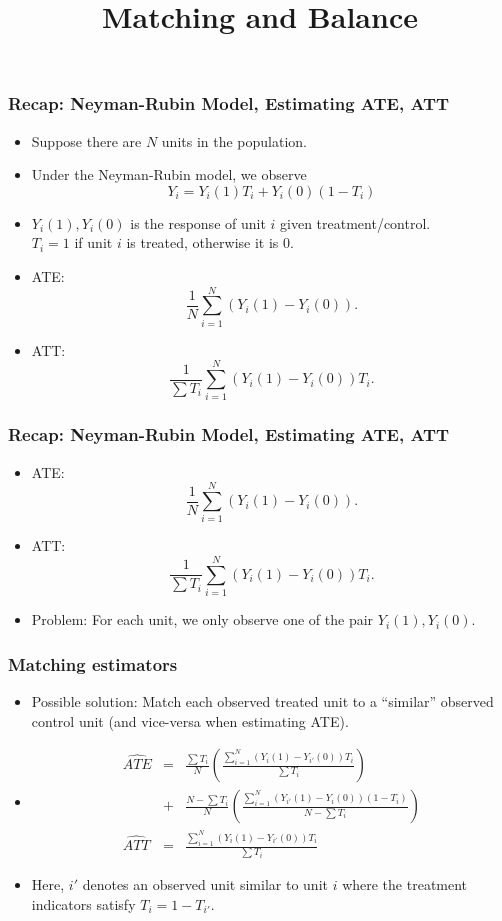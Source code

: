 \documentclass{beamer}
\title{Matching and Balance}
\begin{document}

\frame{\titlepage}
\begin{frame}[c]
\frametitle{Recap: Neyman-Rubin Model, Estimating ATE, ATT}  
  \begin{itemize}  
    \item<1->  Suppose there are $N$ units in the population.\\
    \item<1->Under the Neyman-Rubin model, we observe
      $$Y_i = Y_i(1)T_i + Y_i(0)(1-T_i)$$
    \item<1->
      $Y_i(1),Y_i(0)$ is the response of unit $i$ given treatment/control.\\ 
      $T_i = 1$ if unit $i$ is treated, otherwise it is 0.
    \item<2->ATE:
      $$\frac{1}{N}\sum_{i=1}^N (Y_i(1) - Y_i(0)).$$
    \item<2-> ATT:  
      $$\frac{1}{\sum T_i}\sum_{i=1}^N (Y_i(1) - Y_{i}(0))T_i.$$
  \end{itemize}
\end{frame}

\begin{frame}[c]
\frametitle{Recap: Neyman-Rubin Model, Estimating ATE, ATT}  
  \begin{itemize}
    \item<1->ATE:
      $$\frac{1}{N}\sum_{i=1}^N (Y_i(1) - Y_i(0)).$$
    \item<1-> ATT:  
      $$\frac{1}{\sum T_i}\sum_{i=1}^N (Y_i(1) - Y_{i}(0))T_i.$$
    \item<2->  Problem: For each unit, we only observe one of the pair
      $Y_i(1), Y_i(0)$.    
  \end{itemize}
\end{frame}

\begin{frame}[c]
\frametitle{Matching estimators}  
  \begin{itemize}
   \item<1->  Possible solution: Match each observed 
    treated unit to a ``similar'' observed control unit
     (and vice-versa when estimating ATE).
   \item<2-> 
    \begin{eqnarray*}
       \widehat{ATE} &=& \frac{\sum T_i}{N}\left(
        \frac{\sum_{i=1}^N (Y_i(1) - Y_{i'}(0))T_i}{\sum T_i}\right) \\ 
        &+&
         \frac{N-\sum T_i}{N}\left(\frac{\sum_{i=1}^N (Y_{i'}(1) - Y_{i}(0))(1-T_i)}{N- \sum T_i}
       \right) \\
       \widehat{ATT} &=&\frac{\sum_{i=1}^N (Y_i(1) - Y_{i'}(0))T_i}{\sum T_i}
     \end{eqnarray*}
      \item<2->Here, $i'$ denotes an observed unit similar to unit $i$ where the 
   treatment indicators satisfy $T_i = 1-T_{i'}$.
   \end{itemize}
\end{frame}
\end{document}

